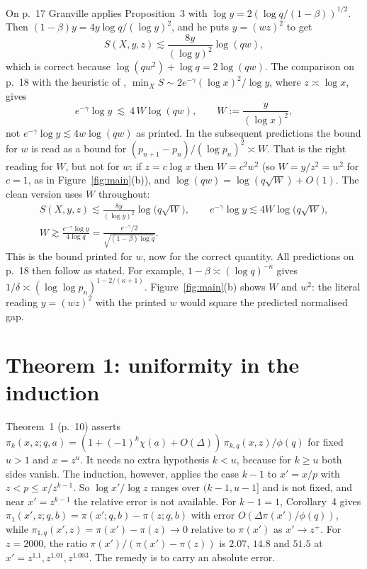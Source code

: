\documentclass[11pt,a4paper]{amsart}
\theoremstyle{remark}
\begin{document}
On p.~17 Granville applies Proposition~3 with $\log y=2(\log q/(1-\beta))^{1/2}$. Then
$(1-\beta)y=4y\log q/(\log y)^2$, and he puts $y=(wz)^2$ to get
\[
S(X,y,z)\lesssim\frac{8y}{(\log y)^2}\log(qw),
\]
which is correct because $\log(qw^2)+\log q=2\log(qw)$. The comparison on p.~18 with the heuristic of \cite{GL},
$\min_XS\sim2e^{-\gamma}(\log x)^2/\log y$, where $z\asymp\log x$, gives
\[
e^{-\gamma}\log y\ \lesssim\ 4\,W\log(qw),\qquad W:=\frac{y}{(\log x)^2},
\]
not $e^{-\gamma}\log y\lesssim4w\log(qw)$ as printed. In the subsequent predictions the bound for $w$ is
read as a bound for $(p_{n+1}-p_n)/(\log p_n)^2\asymp W$. That is the right reading for $W$, but not for
$w$: if $z=c\log x$ then $W=c^2w^2$ (so $W=y/z^2=w^2$ for $c=1$, as in Figure~\ref{fig:main}(b)), and
$\log(qw)=\log(q\sqrt W)+O(1)$. The clean version uses $W$ throughout:
\begin{gather*}
S(X,y,z)\lesssim\frac{8y}{(\log y)^2}\log\bigl(q\sqrt W\bigr),\qquad
e^{-\gamma}\log y\lesssim4W\log\bigl(q\sqrt W\bigr),\\
W\gtrsim\frac{e^{-\gamma}\log y}{4\log q}=\frac{e^{-\gamma}/2}{\sqrt{(1-\beta)\log q}}.
\end{gather*}
This is the bound printed for $w$, now for the correct quantity. All predictions on p.~18 then follow as
stated. For example, $1-\beta\asymp(\log q)^{-\kappa}$ gives
$1/\delta\asymp(\log\log p_n)^{1-2/(\kappa+1)}$. Figure~\ref{fig:main}(b) shows $W$ and $w^2$: the literal
reading $y=(wz)^2$ with the printed $w$ would square the predicted normalised gap.

\section{Theorem 1: uniformity in the induction}\label{sec:thm1}

Theorem~1 (p.~10) asserts
$\pi_k(x,z;q,a)=(1+(-1)^k\chi(a)+O(\varDelta))\,\pi_{k,q}(x,z)/\phi(q)$ for fixed $u>1$ and $x=z^u$.
It needs no extra hypothesis $k<u$, because for $k\ge u$ both sides vanish. The induction, however,
applies the case $k-1$ to $x'=x/p$ with $z<p\le x/z^{k-1}$. So $\log x'/\log z$ ranges over
$(k-1,u-1]$ and is not fixed, and near $x'=z^{k-1}$ the relative error is not available. For $k-1=1$,
Corollary~4 gives $\pi_1(x',z;q,b)=\pi(x';q,b)-\pi(z;q,b)$ with error $O(\varDelta\pi(x')/\phi(q))$,
while $\pi_{1,q}(x',z)=\pi(x')-\pi(z)\to0$ relative to $\pi(x')$ as $x'\to z^+$. For $z=2000$, the ratio
$\pi(x')/(\pi(x')-\pi(z))$ is $2.07$, $14.8$ and $51.5$ at $x'=z^{1.1},z^{1.01},z^{1.003}$. The remedy is
to carry an absolute error.
\end{document}
